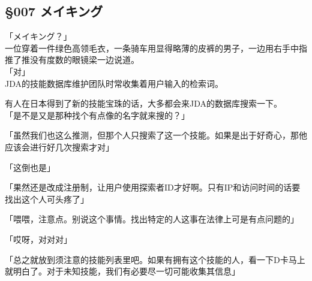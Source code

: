\subsection{§007 メイキング}

「メイキング？」\\

一位穿着一件绿色高领毛衣，一条骑车用显得略薄的皮裤的男子，一边用右手中指推了推没有度数的眼镜梁一边说道。\\

「对」\\

JDA的技能数据库维护团队时常收集着用户输入的检索词。

有人在日本得到了新的技能宝珠的话，大多都会来JDA的数据库搜索一下。\\

「是不是又是那种找个有点像的名字就来搜的？」

「虽然我们也这么推测，但那个人只搜索了这一个技能。如果是出于好奇心，那他应该会进行好几次搜索才对」

「这倒也是」

「果然还是改成注册制，让用户使用探索者ID才好啊。只有IP和访问时间的话要找出这个人可头疼了」

「喂喂，注意点。别说这个事情。找出特定的人这事在法律上可是有点问题的」

「哎呀，对对对」

「总之就放到须注意的技能列表里吧。如果有拥有这个技能的人，看一下D卡马上就明白了。对于未知技能，我们有必要尽一切可能收集其信息」

